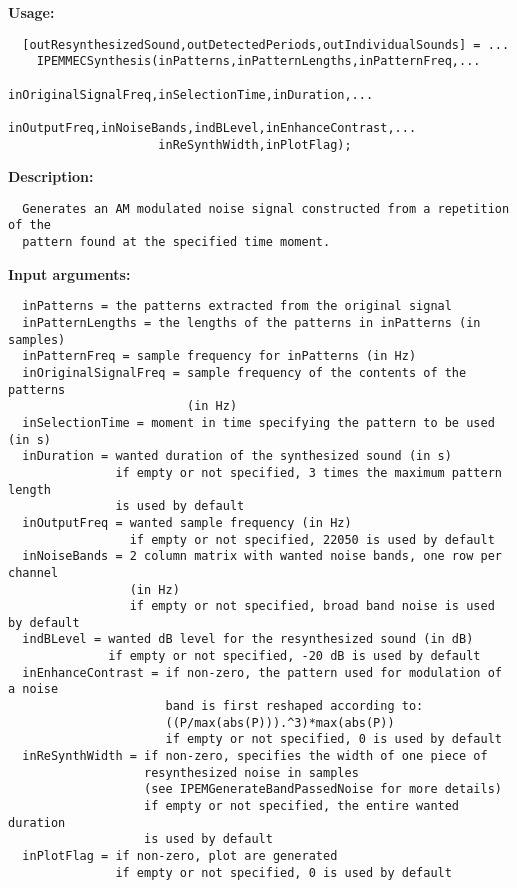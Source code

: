 \textbf{Usage:}
\begin{verbatim}  [outResynthesizedSound,outDetectedPeriods,outIndividualSounds] = ...
    IPEMMECSynthesis(inPatterns,inPatternLengths,inPatternFreq,...
                     inOriginalSignalFreq,inSelectionTime,inDuration,...
                     inOutputFreq,inNoiseBands,indBLevel,inEnhanceContrast,...
                     inReSynthWidth,inPlotFlag);

\end{verbatim}
\textbf{Description:}
\begin{verbatim}  Generates an AM modulated noise signal constructed from a repetition of the
  pattern found at the specified time moment.

\end{verbatim}
\textbf{Input arguments:}
\begin{verbatim}  inPatterns = the patterns extracted from the original signal
  inPatternLengths = the lengths of the patterns in inPatterns (in samples) 
  inPatternFreq = sample frequency for inPatterns (in Hz)
  inOriginalSignalFreq = sample frequency of the contents of the patterns
                         (in Hz)
  inSelectionTime = moment in time specifying the pattern to be used (in s)
  inDuration = wanted duration of the synthesized sound (in s)
               if empty or not specified, 3 times the maximum pattern length
               is used by default
  inOutputFreq = wanted sample frequency (in Hz)
                 if empty or not specified, 22050 is used by default
  inNoiseBands = 2 column matrix with wanted noise bands, one row per channel
                 (in Hz)
                 if empty or not specified, broad band noise is used by default
  indBLevel = wanted dB level for the resynthesized sound (in dB)
              if empty or not specified, -20 dB is used by default
  inEnhanceContrast = if non-zero, the pattern used for modulation of a noise
                      band is first reshaped according to:
                      ((P/max(abs(P))).^3)*max(abs(P))
                      if empty or not specified, 0 is used by default
  inReSynthWidth = if non-zero, specifies the width of one piece of
                   resynthesized noise in samples
                   (see IPEMGenerateBandPassedNoise for more details)
                   if empty or not specified, the entire wanted duration
                   is used by default
  inPlotFlag = if non-zero, plot are generated
               if empty or not specified, 0 is used by default

\end{verbatim}
